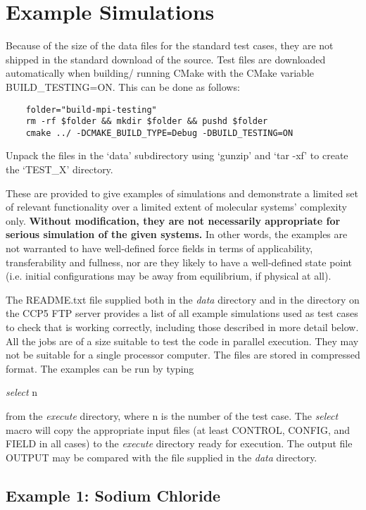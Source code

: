 \section{Example Simulations}

Because of the size of the data files for the \D
standard test cases, they are not shipped in the standard
download of the \D source. Test files are downloaded
automatically when building/ running CMake with the CMake variable BUILD\_TESTING=ON.
This can be done as follows:

\begin{lstlisting}
    folder="build-mpi-testing"
    rm -rf $folder && mkdir $folder && pushd $folder
    cmake ../ -DCMAKE_BUILD_TYPE=Debug -DBUILD_TESTING=ON 
\end{lstlisting}  

Unpack the files in the `data' subdirectory using `gunzip' and
`tar -xf' to create the `TEST\_X' directory.

These are provided to give examples of \D simulations
and demonstrate a limited set of relevant functionality over
a limited extent of molecular systems' complexity only.
{\bf Without modification, they are not necessarily appropriate
for serious simulation of the given systems.} In other words,
the examples are not warranted to have well-defined force
fields in terms of applicability, transferability and fullness, nor
are they likely to have a well-defined state point (i.e. initial
configurations may be away from equilibrium, if physical at all).

The README.txt file supplied both in the {\em data} directory and
in the directory on the CCP5 FTP server provides a list of all
example simulations used as test cases to check that \D is working
correctly, including those described in more detail below.  All the
jobs are of a size suitable to test the code in parallel execution.  They
may not be suitable for a single processor computer.  The files
are stored in compressed format.  The examples can be run by typing

{\sl select } n

\noindent from the {\em execute} directory, where n is the number of
the test case.  The {\sl select} macro will copy the appropriate
input files (at least CONTROL, CONFIG, and FIELD in all cases)
to the {\em execute} directory ready for execution.  The output file
OUTPUT may be compared with the file supplied in the {\em data}
directory.

\subsection{Example 1: Sodium Chloride}

